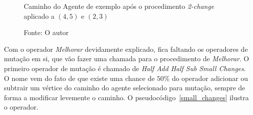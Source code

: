 \begin{figure}[H]
	\caption{Caminho do Agente de exemplo após o procedimento \textit{2-change} aplicado a $(4,5)$ e $(2,3)$}
	\centering
	\caption*{Fonte: O autor}
	\label{2_change_ex2}
\end{figure}

Com o operador \textit{Melhorar} devidamente explicado, fica faltando os 
operadores de mutação em si, que vão fazer uma chamada para o procedimento de 
\textit{Melhorar}. O primeiro operador de mutação é chamado de 
\textit{Half Add Half Sub Small Changes}. O nome vem do fato de que existe 
uma chance de $50\%$ do operador adicionar ou subtrair um vértice do caminho do 
agente selecionado para mutação, sempre de forma a modificar levemente o caminho.
O pseudocódigo~\ref{small_changes} ilustra o operador.

